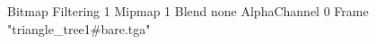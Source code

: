 {Bitmap
	{Filtering 1}
	{Mipmap 1}
	{Blend none}
	{AlphaChannel 0}
	{Frame "triangle_tree1#bare.tga"}
}
